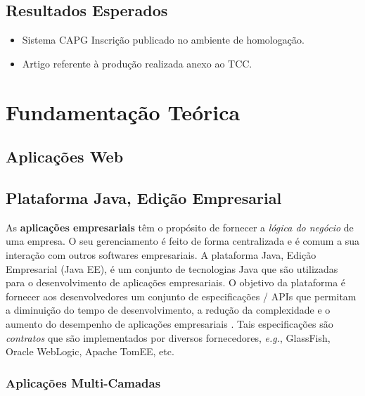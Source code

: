 \documentclass[
  10.5pt,				  %
	openright,			%
	twoside,			  %
  a5paper,
  chapter=TITLE,	%
	section=TITLE,	%
  hyphens,        %
	english,        %
	brazil          %
]{abntex2}
\begin{document}
\section{Resultados Esperados}
\begin{itemize}
  \item Sistema CAPG Inscrição publicado no ambiente de homologação.
  \item Artigo referente à produção realizada anexo ao TCC.
\end{itemize}



\chapter{Fundamentação Teórica}

\section{Aplicações Web}


\section{Plataforma Java, Edição Empresarial}\label{sec:java2e}

As \textbf{aplicações empresariais} têm o propósito de fornecer a \emph{lógica do negócio} de uma empresa. O seu gerenciamento é feito de forma centralizada e é comum a sua interação com outros softwares empresariais. A plataforma Java, Edição Empresarial (Java EE), é um conjunto de tecnologias Java que são utilizadas para o desenvolvimento de aplicações empresariais. O objetivo da plataforma é fornecer aos desenvolvedores um conjunto de especificações / APIs que permitam a diminuição do tempo de desenvolvimento, a redução da complexidade e o aumento do desempenho de aplicações empresariais \cite{javaee7}. Tais especificações são \emph{contratos} que são implementados por diversos fornecedores, \emph{e.g.}, GlassFish, Oracle WebLogic, Apache TomEE, etc.

\subsection{Aplicações Multi-Camadas}
\end{document}
